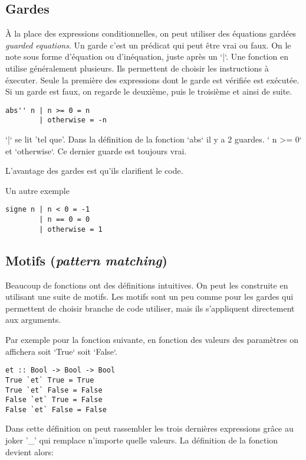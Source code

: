 \documentclass[11pt]{article}
\begin{document}
\subsection{Gardes}
\label{sec:orgfa7e38a}
À la place des expressions conditionnelles,  on peut utiliser des équations gardées \emph{guarded equations}.  Un garde c'est un prédicat qui peut être vrai ou faux.   On le note sous forme d'équation ou d'inéquation, juste après un `|`.    Une fonction en utilise généralement plusieurs.
Ils permettent de choisir les instructions à éxecuter. Seule la première des expressions dont le garde est vérifiée est exécutée.  Si un garde est faux, on regarde le deuxième, puis le troisième et ainsi de suite.

\begin{verbatim}
abs'' n | n >= 0 = n
        | otherwise = -n
\end{verbatim}
`|`  se lit 'tel que'.  Dans la définition de la fonction `abs` il y a 2 guardes. ` n >= 0` et `otherwise`.  Ce dernier guarde est toujours vrai.

L'avantage des gardes est qu'ils clarifient le code.

Un autre exemple
\begin{verbatim}
signe n | n < 0 = -1
        | n == 0 = 0
        | otherwise = 1
\end{verbatim}

\subsection{Motifs (\emph{pattern matching})}
\label{sec:org4f87473}

 Beaucoup de fonctions ont des définitions intuitives.  On peut les construite en utilisant une suite de motifs.  
Les motifs sont un peu comme pour les gardes qui permettent de choisir branche de code utiliser, mais ils s'appliquent directement aux arguments.  

Par exemple pour la fonction suivante, en fonction des valeurs des paramètres on affichera soit `True` soit `False`.

\begin{verbatim}
et :: Bool -> Bool -> Bool
True `et` True = True
True `et` False = False
False `et` True = False
False `et` False = False
\end{verbatim}

Dans cette définition on peut rassembler les trois dernières expressions grâce au joker '\_'  qui remplace n'importe quelle valeurs.  La définition de la fonction devient alors:
\end{document}
